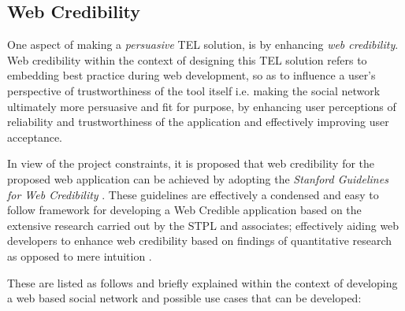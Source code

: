 \subsection{Web Credibility}

One aspect of making a \textit{persuasive} TEL solution, is by enhancing \textit{web credibility}. Web credibility within the context of designing this TEL solution refers to embedding best practice during web development, so as to influence a user's perspective of trustworthiness of the tool itself \cite{Fogg2001,Fogg2002} i.e. making the social network ultimately more persuasive and fit for purpose, by enhancing user perceptions of reliability and trustworthiness of the application \cite{Fogg2001} and effectively improving user acceptance.


In view of the project constraints, it is proposed that web credibility for the proposed web application can be achieved by adopting  the \textit{Stanford Guidelines for Web Credibility} \cite{Fogg2002a}. These guidelines are effectively a condensed and easy to follow framework for developing a Web Credible application based on the extensive research carried out by the STPL and associates; effectively aiding web developers to enhance web credibility based on findings of quantitative research as opposed to mere intuition \cite{Fogg2002a,Fogg2002,Fogg1999}.

These are listed as follows and briefly explained within the context of developing a web based social network and possible use cases that can be developed:


